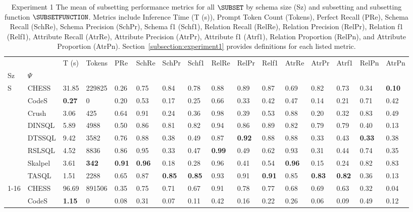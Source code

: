 \begin{table}
\caption{Experiment 1 The mean of subsetting performance metrics for all $\SUBSET$ by schema size (Sz) and subsetting and subsetting 
function $\SUBSETFUNCTION$. Metrics include Inference Time (T (s)), Prompt Token Count (Tokens), Perfect Recall (PRe), 
Schema Recall (SchRe), Schema Precision (SchPr), Schema f1 (Schf1), Relation Recall (RelRe), Relation Precision (RelPr),
Relation f1 (Relf1), Attribute Recall (AtrRe), Attribute Precision (AtrPr), Attribute f1 (Atrf1), Relation Proportion (RelPn), 
and Attribute Proportion (AtrPn). Section~\ref{subsection:experiment1} provides definitions for each listed metric.}
\label{tab:exp1-all-size-schema}
\begin{tabular}{llllllllllllllll}
\toprule
 &  & T (s) & Tokens & PRe & SchRe & SchPr & Schf1 & RelRe & RelPr & Relf1 & AtrRe & AtrPr & Atrf1 & RelPn & AtrPn \\
Sz & $\Psi$ &  &  &  &  &  &  &  &  &  &  &  &  &  &  \\
\midrule
\multirow[t]{8}{*}{S} & CHESS & 31.85 & 229825 & 0.26 & 0.75 & 0.84 & 0.78 & 0.88 & 0.89 & 0.87 & 0.69 & 0.82 & 0.73 & 0.34 & \textbf{0.10} \\
 & CodeS & \textbf{0.27} & 0 & 0.20 & 0.53 & 0.17 & 0.25 & 0.66 & 0.33 & 0.42 & 0.47 & 0.14 & 0.21 & 0.71 & 0.42 \\
 & Crush & 3.06 & 425 & 0.64 & 0.91 & 0.24 & 0.36 & 0.98 & 0.39 & 0.53 & 0.88 & 0.20 & 0.32 & 0.83 & 0.49 \\
 & DINSQL & 5.89 & 4988 & 0.50 & 0.86 & 0.81 & 0.82 & 0.94 & 0.86 & 0.89 & 0.82 & 0.79 & 0.79 & 0.40 & 0.13 \\
 & DTSSQL & 9.42 & 3582 & 0.76 & 0.88 & 0.38 & 0.49 & 0.87 & \textbf{0.92} & 0.88 & 0.88 & 0.33 & 0.43 & \textbf{0.33} & 0.38 \\
 & RSLSQL & 4.52 & 8836 & 0.86 & 0.95 & 0.33 & 0.47 & \textbf{0.99} & 0.49 & 0.62 & 0.93 & 0.31 & 0.44 & 0.74 & 0.35 \\
 & Skalpel & 3.61 & \textbf{342} & \textbf{0.91} & \textbf{0.96} & 0.18 & 0.28 & 0.96 & 0.41 & 0.54 & \textbf{0.96} & 0.15 & 0.24 & 0.82 & 0.83 \\
 & TASQL & 1.51 & 2288 & 0.65 & 0.87 & \textbf{0.85} & \textbf{0.85} & 0.93 & 0.91 & \textbf{0.91} & 0.85 & \textbf{0.83} & \textbf{0.82} & 0.36 & 0.13 \\
\cline{1-16}
\multirow[t]{8}{*}{M} & CHESS & 96.69 & 891506 & 0.35 & 0.75 & 0.71 & 0.67 & 0.91 & 0.78 & 0.77 & 0.68 & 0.69 & 0.63 & 0.32 & 0.04 \\
 & CodeS & \textbf{1.15} & 0 & 0.08 & 0.31 & 0.07 & 0.11 & 0.42 & 0.16 & 0.22 & 0.26 & 0.06 & 0.09 & 0.49 & 0.12 \\

\end{tabular}
\end{table}

